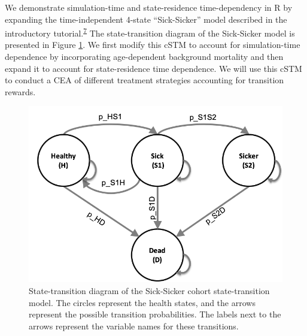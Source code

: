 \documentclass[
]{article}
\begin{document}
We demonstrate simulation-time and state-residence time-dependency in R by expanding the time-independent 4-state ``Sick-Sicker'' model described in the introductory tutorial.\textsuperscript{\protect\hyperlink{ref-Alarid-Escudero2021a}{7}} The state-transition diagram of the Sick-Sicker model is presented in Figure \ref{fig:STD-Sick-Sicker}. We first modify this cSTM to account for simulation-time dependence by incorporating age-dependent background mortality and then expand it to account for state-residence time dependence. We will use this cSTM to conduct a CEA of different treatment strategies accounting for transition rewards.

\begin{figure}[H]

{\centering \includegraphics[width=10.64in]{figs/Sick-Sicker} 

}

\caption{State-transition diagram of the Sick-Sicker cohort state-transition model. The circles represent the health states, and the arrows represent the possible transition probabilities. The labels next to the arrows represent the variable names for these transitions.}\label{fig:STD-Sick-Sicker}
\end{figure}
\end{document}
